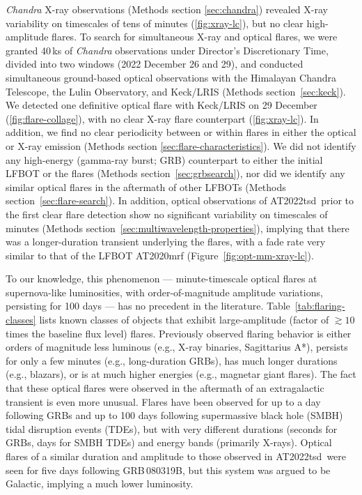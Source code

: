 \documentclass{nature_plusfigure}
\newcommand{\at}{AT2022tsd}
\begin{document}
\emph{Chandra} X-ray observations\cite{Matthews2022} (Methods section \ref{sec:chandra}) revealed X-ray variability on timescales of tens of minutes (\ref{fig:xray-lc}), but no clear high-amplitude flares. To search for simultaneous X-ray and optical flares,
we were granted 40\,ks of {\it Chandra} observations under Director's Discretionary Time, divided into two windows (2022 December 26 and 29),
and conducted simultaneous ground-based optical observations with the Himalayan Chandra Telescope, the Lulin Observatory, and Keck/LRIS (Methods section~\ref{sec:keck}). We detected one definitive optical flare with Keck/LRIS on 29 December (\ref{fig:flare-collage}), with no clear X-ray flare counterpart (\ref{fig:xray-lc}).
In addition, we find no clear periodicity between or within flares in either the optical or X-ray emission (Methods section \ref{sec:flare-characteristics}).
We did not identify any high-energy (gamma-ray burst; GRB) counterpart to either the initial LFBOT or the flares (Methods section~\ref{sec:grbsearch}), nor did we identify any similar optical flares in the aftermath of other LFBOTs (Methods section~\ref{sec:flare-search}).
In addition, optical observations of \at\ prior to the first clear flare detection show no significant variability on timescales of minutes (Methods section~\ref{sec:multiwavelength-properties}), implying that there was a longer-duration transient underlying the flares, with a fade rate very similar to that of the LFBOT AT2020mrf\cite{Yao2022} (Figure~\ref{fig:opt-mm-xray-lc}).

To our knowledge, this phenomenon --- minute-timescale optical flares at supernova-like luminosities, with order-of-magnitude amplitude variations, persisting for 100 days --- has no precedent in the literature.
 Table~\ref{tab:flaring-classes} lists known classes of objects that exhibit large-amplitude (factor of $\gtrsim10$ times the baseline flux level) flares. Previously observed flaring behavior is either orders of magnitude less luminous (e.g., X-ray binaries\cite{Fender1997}, Sagittarius A*\cite{Marrone2008}), persists for only a few minutes (e.g., long-duration GRBs\cite{Racusin2008}), has much longer durations (e.g., blazars\cite{Nesci2021}), or is at much higher energies (e.g., magnetar giant flares\cite{Hurley1999}).
The fact that these optical flares were observed in the aftermath of an extragalactic transient is even more unusual.
Flares have been observed for up to a day following GRBs\cite{Kumar2015} and up to 100 days following supermassive black hole (SMBH) tidal disruption events (TDEs\cite{Mangano2016,vanVelzen2021}), but with very different durations (seconds for GRBs, days for SMBH TDEs) and energy bands (primarily X-rays). Optical flares of a similar duration and amplitude to those observed in \at\ were seen for five days following GRB\,080319B, but this system was argued to be Galactic\cite{Kasliwal2008,CastroTirado2008,Stefanescu2008}, implying a much lower luminosity.
\end{document}
